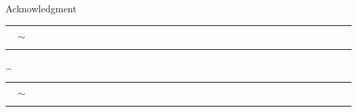 \documentclass[../main.tex]{subfile}
\begin{document}
\thispagestyle{empty}
\vspace*{24pt}
\begin{center}
    \LARGE Acknowledgment \normalsize\\
    \rule[3pt]{0.04\textwidth}{0.2pt} $\quad\sim\quad$\rule[3pt]{.04\textwidth}{0.2pt} 
\end{center}
\vspace*{36pt}


\dots
\begin{center}
    \rule{0.1\textwidth}{0.2pt} $\quad\sim\quad$\rule{0.1\textwidth}{0.2pt} 
\end{center}
\end{document}
